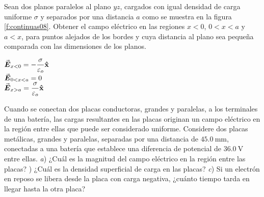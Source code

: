 %
\begin{Exercise}\label{p:continuas08}
  Sean dos planos paralelos al plano $yz$, cargados con igual densidad de carga uniforme $\sigma$ y separados por una distancia $a$ como se muestra en la figura \ref{f:continuas08}. Obtener el campo eléctrico en las regiones $x<0$, $0<x<a$ y $a<x$, para puntos alejados de los bordes y cuya distancia al plano sea pequeña comparada con las dimensiones de los planos.
\end{Exercise}
\begin{Answer}
  \begin{minipage}[t]{.4\textwidth}
    $\va*{E}_{x<0} = -\dfrac{\sigma}{\varepsilon_o} \vu{x}$\\ $\va*{E}_{0<x<a} = 0$\\ $\va*{E}_{x>a} = \dfrac{\sigma}{\varepsilon_o} \vu{x}$
  \end{minipage}
\end{Answer}
%
\begin{center}
\end{center}
%
\begin{Exercise}
  Cuando se conectan dos placas conductoras, grandes y paralelas, a los terminales de una batería, las cargas resultantes en las placas originan un campo eléctrico en la región entre ellas que puede ser considerado uniforme. Considere dos placas metálicas, grandes y paralelas, separadas por una distancia de $\SI{45.0}{\milli\metre}$, conectadas a una batería que establece una diferencia de potencial de $\SI{36.0}{\volt}$ entre ellas. \textit{a}) ¿Cuál es la magnitud del campo eléctrico en la región entre las placas? ) ¿Cuál es la densidad superficial de carga en las placas? \textit{c}) Si un electrón en reposo se libera desde la placa con carga negativa, ¿cuánto tiempo tarda en llegar hasta la otra placa?
\end{Exercise}
